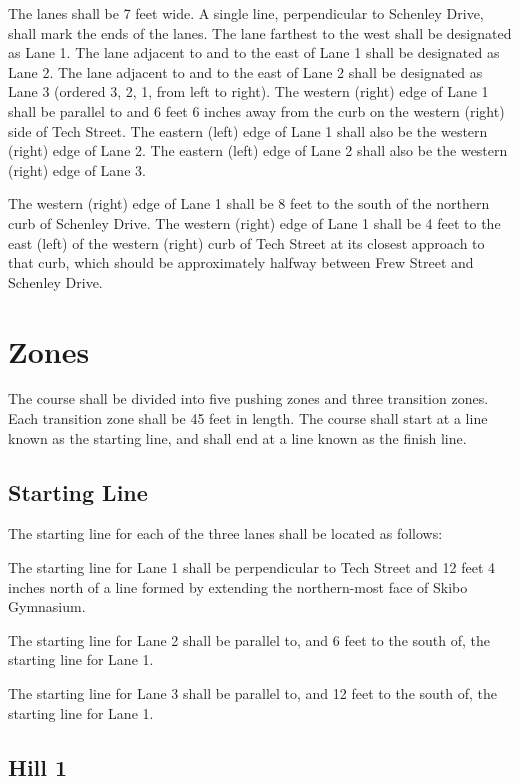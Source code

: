 	The lanes shall be 7 feet wide. A single line, perpendicular to Schenley Drive,
	shall mark the ends of the lanes. The lane farthest to the west shall be
	designated as Lane 1. The lane adjacent to and to the east of Lane 1 shall be
	designated as Lane 2. The lane adjacent to and to the east of Lane 2 shall be
	designated as Lane 3 (ordered 3, 2, 1, from left to right). The western (right)
	edge of Lane 1 shall be parallel to and 6 feet 6 inches away from the curb on
	the western (right) side of Tech Street. The eastern (left) edge of Lane 1
	shall also be the western (right) edge of Lane 2. The eastern (left) edge of
	Lane 2 shall also be the western (right) edge of Lane 3.

	The western (right) edge of Lane 1 shall be 8 feet to the south of the northern
	curb of Schenley Drive. The western (right) edge of Lane 1 shall be 4 feet to
	the east (left) of the western (right) curb of Tech Street at its closest
	approach to that curb, which should be approximately halfway between Frew
	Street and Schenley Drive.

\section{Zones}

	The course shall be divided into five pushing zones and three transition zones.
	Each transition zone shall be 45 feet in length. The course shall start at a
	line known as the starting line, and shall end at a line known as the finish
	line.

\subsection{Starting Line}

	The starting line for each of the three lanes shall be located as follows:

	The starting line for Lane 1 shall be perpendicular to Tech Street and 12 feet
	4 inches north of a line formed by extending the northern-most face of Skibo
	Gymnasium.

	The starting line for Lane 2 shall be parallel to, and 6 feet to the south of,
	the starting line for Lane 1.

	The starting line for Lane 3 shall be parallel to, and 12 feet to the south of,
	the starting line for Lane 1.

\subsection{Hill 1}

